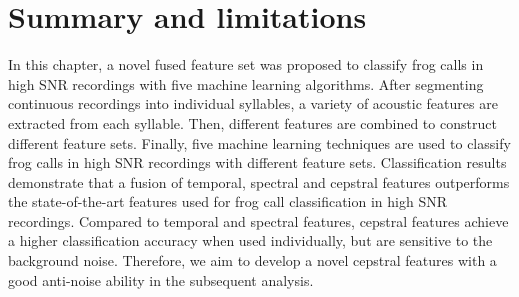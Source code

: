 \section{Summary and limitations}

In this chapter, a novel fused feature set was proposed to classify frog calls in high SNR recordings with five machine learning algorithms.
After segmenting continuous recordings into individual syllables, a variety of acoustic features are extracted from each syllable. Then, different features are combined to construct different feature sets. Finally, five machine learning techniques are used to classify frog calls in high SNR recordings with different feature sets. Classification results demonstrate that a fusion of temporal, spectral and cepstral features outperforms the state-of-the-art features used for frog call classification in high SNR recordings. Compared to temporal and spectral features, cepstral features achieve a higher classification accuracy when used individually, but are sensitive to the background noise. Therefore, we aim to develop a novel cepstral features with a good anti-noise ability in the subsequent analysis.


%
